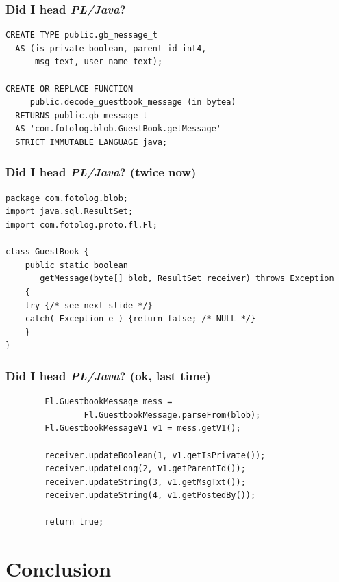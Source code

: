 \documentclass[english]{beamer}
\begin{document}
\begin{frame}[fragile]
  \frametitle{Did I head \textit{PL/Java}?}

  \begin{example}
\begin{verbatim}
CREATE TYPE public.gb_message_t
  AS (is_private boolean, parent_id int4,
      msg text, user_name text);

CREATE OR REPLACE FUNCTION
     public.decode_guestbook_message (in bytea)
  RETURNS public.gb_message_t
  AS 'com.fotolog.blob.GuestBook.getMessage'
  STRICT IMMUTABLE LANGUAGE java;
\end{verbatim}
  \end{example}
\end{frame}

\begin{frame}[fragile]
  \frametitle{Did I head \textit{PL/Java}? (twice now)}

  \begin{example}
\begin{verbatim}
package com.fotolog.blob;
import java.sql.ResultSet;
import com.fotolog.proto.fl.Fl;

class GuestBook {
    public static boolean
       getMessage(byte[] blob, ResultSet receiver) throws Exception
    {
	try {/* see next slide */}
	catch( Exception e ) {return false; /* NULL */}
    }
}
\end{verbatim}
  \end{example}
\end{frame}

\begin{frame}[fragile]
  \frametitle{Did I head \textit{PL/Java}? (ok, last time)}

  \begin{example}
\begin{verbatim}
	    Fl.GuestbookMessage mess =
	    	    Fl.GuestbookMessage.parseFrom(blob);
	    Fl.GuestbookMessageV1 v1 = mess.getV1();

	    receiver.updateBoolean(1, v1.getIsPrivate());
	    receiver.updateLong(2, v1.getParentId());
	    receiver.updateString(3, v1.getMsgTxt());
	    receiver.updateString(4, v1.getPostedBy());

	    return true;
\end{verbatim}
  \end{example}
\end{frame}

\section{Conclusion}
\end{document}

